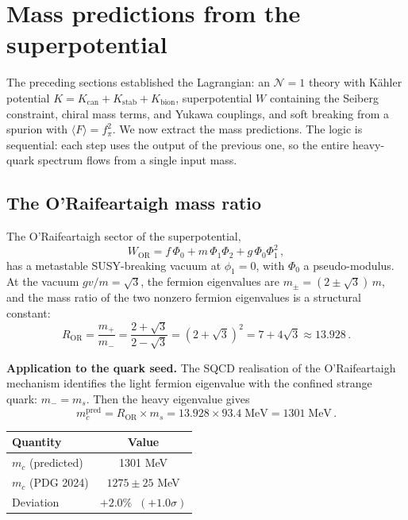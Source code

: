 \documentclass[12pt,a4paper]{article}
\newcommand{\fpi}{f_\pi}
\begin{document}
\section{Mass predictions from the superpotential}
\label{sec:predictions}

The preceding sections established the Lagrangian: an $\mathcal{N}=1$
theory with K\"ahler potential $K = K_{\mathrm{can}} + K_{\mathrm{stab}} + K_{\mathrm{bion}}$,
superpotential $W$ containing the Seiberg constraint, chiral mass terms,
and Yukawa couplings, and soft breaking from a spurion with
$\langle F\rangle = \fpi^2$. We now extract the mass predictions.
The logic is sequential: each step uses the output of the previous one,
so the entire heavy-quark spectrum flows from a single input mass.

\subsection{The O'Raifeartaigh mass ratio}

The O'Raifeartaigh sector of the superpotential,
\begin{equation}
W_{\mathrm{OR}} = f\,\Phi_0 + m\,\Phi_1\Phi_2 + g\,\Phi_0\Phi_1^2\,,
\end{equation}
has a metastable SUSY-breaking vacuum at $\phi_1 = 0$, with
$\Phi_0$ a pseudo-modulus. At the vacuum
$gv/m = \sqrt{3}$, the fermion eigenvalues are
$m_\pm = (2 \pm \sqrt{3})\,m$,
and the mass ratio of the two nonzero fermion eigenvalues is
a structural constant:
\begin{equation}
R_{\mathrm{OR}}
= \frac{m_+}{m_-}
= \frac{2 + \sqrt{3}}{2 - \sqrt{3}}
= (2 + \sqrt{3})^2
= 7 + 4\sqrt{3}
\approx 13.928\,.
\end{equation}

\textbf{Application to the quark seed.} The SQCD realisation of the
O'Raifeartaigh mechanism identifies the light fermion eigenvalue with
the confined strange quark: $m_- = m_s$. Then the heavy eigenvalue gives
\begin{equation}
m_c^{\mathrm{pred}} = R_{\mathrm{OR}} \times m_s
= 13.928 \times 93.4\;\mathrm{MeV}
= 1301\;\mathrm{MeV}\,.
\end{equation}

\begin{center}
\begin{tabular}{lc}
\toprule
Quantity & Value \\
\midrule
$m_c$ (predicted) & 1301 MeV \\
$m_c$ (PDG 2024) & $1275 \pm 25$ MeV \\
Deviation & $+2.0\%\;\;(+1.0\sigma)$ \\
\bottomrule
\end{tabular}
\end{center}
\end{document}

